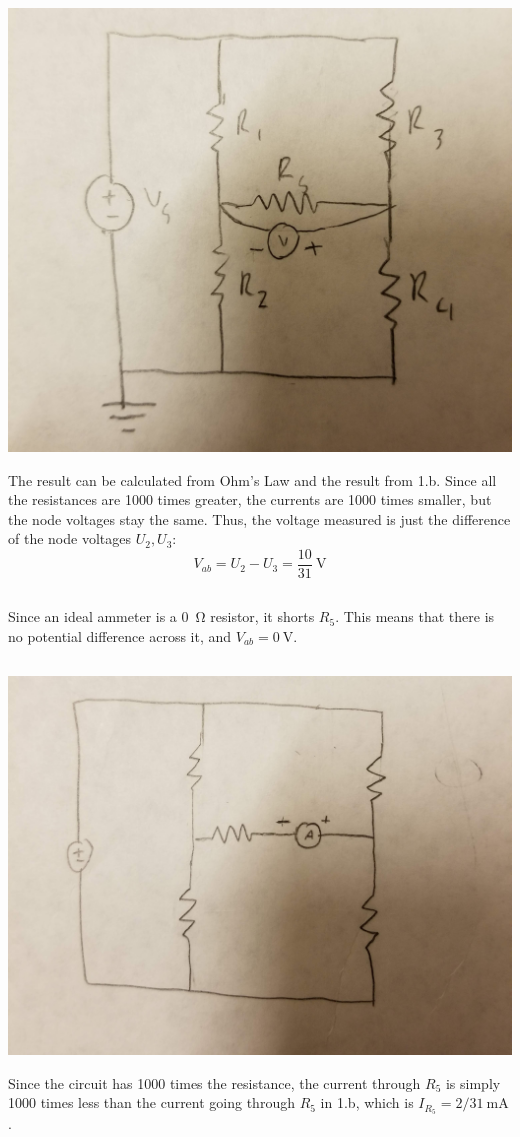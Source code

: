 \documentclass[]{article}
\begin{document}
\begin{center}
	\includegraphics[width=0.7\linewidth]{20191018_214624}
\end{center}
The result can be calculated from Ohm's Law and the result from 1.b. 
Since all the resistances are 1000 times greater, the currents are 1000 times smaller, but the node voltages stay the same. Thus, the voltage measured is just the difference of the node voltages \(U_2, U_3\): 
\begin{equation}
	V_{ab} = U_2 - U_3 = \frac{10}{31} \ \si{\volt}
\end{equation}

\subsection{}

Since an ideal ammeter is a \SI{0}{\ohm} resistor, it shorts \(R_5\). 
This means that there is no potential difference across it, and \(V_{ab} = \SI{0}{\volt}\). 

\subsection{}

\begin{center}
	\includegraphics[width=0.7\linewidth]{20191018_214633}
\end{center}
Since the circuit has 1000 times the resistance, the current through \(R_5\) is simply 1000 times less than the current going through \(R_5\) in 1.b, which is \(I_{R_5} = 2/31 \ \si{\milli\ampere}\). 
\end{document}
